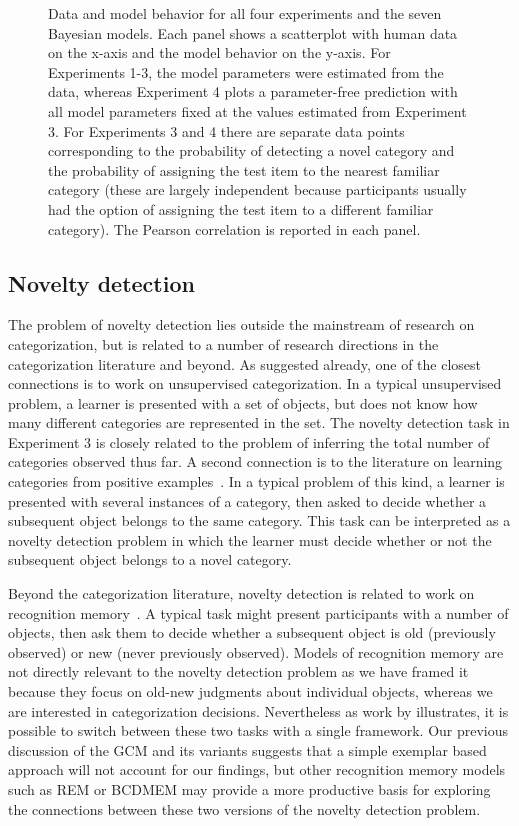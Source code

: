 \documentclass[doc]{apa6}
\begin{document}
\begin{figure}[p]
\begin{center}
\caption{Data and model behavior for all four experiments and the seven Bayesian models. Each panel shows a scatterplot with human data on the x-axis and the model behavior on the y-axis. For Experiments 1-3, the model parameters were estimated from the data, whereas Experiment 4 plots a parameter-free prediction with all model parameters fixed at the values estimated from Experiment 3. For Experiments 3 and 4 there are separate data points corresponding to the probability of detecting a novel category and the probability of assigning the test item to the nearest familiar category (these are largely independent because participants usually had the option of assigning the test item to a different familiar category). The Pearson correlation is reported in each panel.}
\label{fig:all}
\end{center}
\end{figure}


\subsection{Novelty detection}

The problem of novelty detection lies outside the mainstream of research on categorization, but is related to a number of research directions in the categorization literature and beyond. As suggested already, one of the closest connections is to work on unsupervised categorization.  In a typical unsupervised problem, a learner is presented with a set of objects, but does not know how many different categories are represented in the set. The novelty detection task in Experiment 3 is closely related to the problem of inferring the total number of categories observed thus far. A second connection is to the literature on learning categories from positive examples~\cite{feldman_structure_1997,xu_word_2007}. In a typical problem of this kind, a learner is presented with several instances of a category, then asked to decide whether a subsequent object belongs to the same category. This task can be interpreted as a novelty detection problem in which the learner must decide whether or not the subsequent object belongs to a novel category.

Beyond the categorization literature, novelty detection is related to work on recognition memory~\cite{malmberg2008recognition}. A typical task might present participants with a number of objects, then ask them to decide whether a subsequent object is old (previously observed) or new (never previously observed). Models of recognition memory are not directly relevant to the novelty detection problem as we have framed it because they focus on old-new judgments about individual objects, whereas we are interested in categorization decisions. Nevertheless as work by  illustrates, it is possible to switch between these two tasks with a single framework. Our previous discussion of the GCM and its variants suggests that a simple exemplar based approach will not account for our findings, but other recognition memory models such as REM \cite{shiffrin_model_1997} or BCDMEM \cite{dennis_context_2001} may provide a more productive basis for exploring the connections between these two versions of the novelty detection problem.
\end{document}
